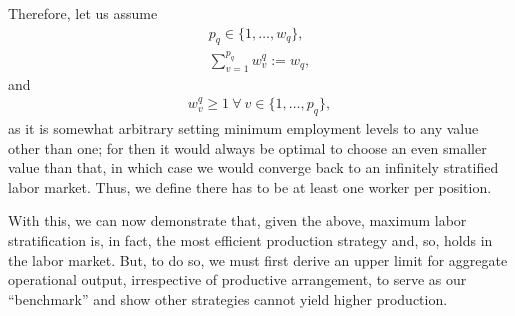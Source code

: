 \documentclass[hidelinks, nonatbib]{elsarticle}
\begin{document}
\begin{axiom}
    Therefore, let us assume
    \begin{gather}
    p_q \in \{1, \dots, w_q\}
    ,
    \\
    \sum_{v=1}^{p_q}
    w_{v}^{q}
    :=
    w_q
    ,
    \end{gather}
    and
    \begin{gather}
    w_{v}^{q}
    \geq
    1
    \
    \forall
    \
    v \in \{1, \dots, p_q\}
    ,
    \end{gather}
    as it is somewhat arbitrary setting minimum employment levels to any value other than one; for then it would always be optimal to choose an even smaller value than that, in which case we would converge back to an infinitely stratified labor market. Thus, we define there has to be at least one worker per position.
\end{axiom}

With this, we can now demonstrate that, given the above, maximum labor stratification is, in fact, the most efficient production strategy and, so, holds in the labor market. But, to do so, we must first derive an upper limit for aggregate operational output, irrespective of productive arrangement, to serve as our ``benchmark'' and show other strategies cannot yield higher production.
\end{document}
